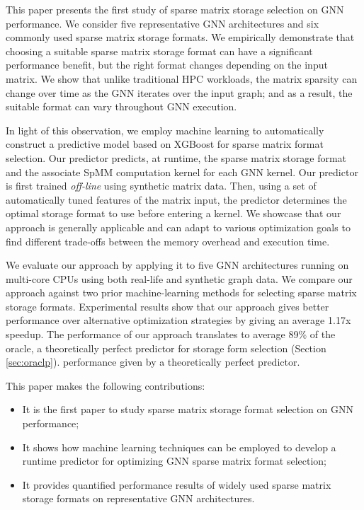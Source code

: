 This paper presents the first study of sparse matrix storage selection on GNN performance. We consider five representative GNN
architectures and six commonly used sparse matrix storage formats. We empirically
demonstrate that choosing a suitable sparse matrix storage format  can  have  a  significant  performance  benefit,  but  the  right  format
changes depending on the input matrix. We show that unlike traditional HPC workloads, the matrix sparsity can change over time as the GNN iterates over the input graph; and as a result, the suitable format can vary throughout GNN execution.

In light of this observation, we employ machine learning to automatically construct a predictive model based on XGBoost \cite{chen2015xgboost} for sparse matrix format selection.
Our predictor predicts, at runtime, the sparse matrix storage format and the associate SpMM computation kernel for each GNN kernel. Our predictor is first trained \emph{off-line} using synthetic matrix data. Then, using a set of automatically tuned features of
the matrix input, the predictor determines the optimal storage format to use before entering a kernel. We showcase that our approach is
generally applicable and can adapt to various optimization goals to find different trade-offs between the memory overhead and execution
time.



We evaluate our approach by applying it to five GNN architectures running on multi-core CPUs using both real-life and synthetic graph data.
We compare our approach against two prior machine-learning methods \cite{sedaghati2015automatic,pichel2019sparse} for selecting sparse
matrix storage formats. Experimental results show that our approach gives better performance over alternative optimization strategies by
giving an average 1.17x speedup. The performance of our approach translates to average 89\% of the oracle, a theoretically perfect
predictor for storage form selection (Section \ref{sec:oraclp}). performance given by a theoretically perfect predictor.

This paper makes
the following contributions:

\begin{itemize}
\item It is the first paper to study sparse matrix storage format selection on GNN performance;
\item It shows how machine learning techniques can be employed to develop a runtime predictor for optimizing GNN sparse matrix format selection;
\item It provides quantified performance results of widely used sparse matrix storage formats on representative GNN architectures.
\end{itemize}
